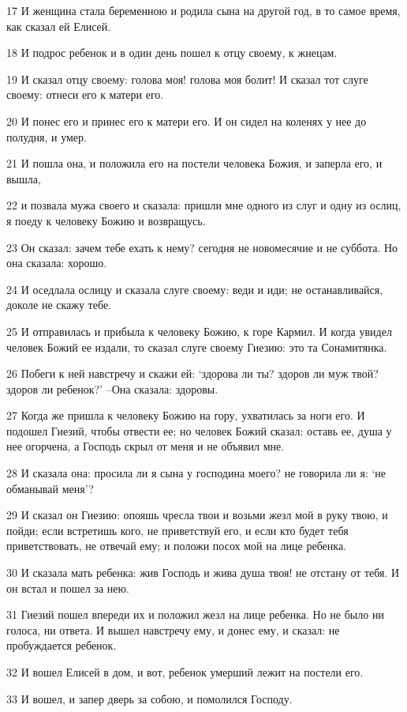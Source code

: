\par 17 И женщина стала беременною и родила сына на другой год, в то самое время, как сказал ей Елисей.
\par 18 И подрос ребенок и в один день пошел к отцу своему, к жнецам.
\par 19 И сказал отцу своему: голова моя! голова моя болит! И сказал тот слуге своему: отнеси его к матери его.
\par 20 И понес его и принес его к матери его. И он сидел на коленях у нее до полудня, и умер.
\par 21 И пошла она, и положила его на постели человека Божия, и заперла его, и вышла,
\par 22 и позвала мужа своего и сказала: пришли мне одного из слуг и одну из ослиц, я поеду к человеку Божию и возвращусь.
\par 23 Он сказал: зачем тебе ехать к нему? сегодня не новомесячие и не суббота. Но она сказала: хорошо.
\par 24 И оседлала ослицу и сказала слуге своему: веди и иди; не останавливайся, доколе не скажу тебе.
\par 25 И отправилась и прибыла к человеку Божию, к горе Кармил. И когда увидел человек Божий ее издали, то сказал слуге своему Гиезию: это та Сонамитянка.
\par 26 Побеги к ней навстречу и скажи ей: `здорова ли ты? здоров ли муж твой? здоров ли ребенок?' --Она сказала: здоровы.
\par 27 Когда же пришла к человеку Божию на гору, ухватилась за ноги его. И подошел Гиезий, чтобы отвести ее; но человек Божий сказал: оставь ее, душа у нее огорчена, а Господь скрыл от меня и не объявил мне.
\par 28 И сказала она: просила ли я сына у господина моего? не говорила ли я: `не обманывай меня'?
\par 29 И сказал он Гиезию: опояшь чресла твои и возьми жезл мой в руку твою, и пойди; если встретишь кого, не приветствуй его, и если кто будет тебя приветствовать, не отвечай ему; и положи посох мой на лице ребенка.
\par 30 И сказала мать ребенка: жив Господь и жива душа твоя! не отстану от тебя. И он встал и пошел за нею.
\par 31 Гиезий пошел впереди их и положил жезл на лице ребенка. Но не было ни голоса, ни ответа. И вышел навстречу ему, и донес ему, и сказал: не пробуждается ребенок.
\par 32 И вошел Елисей в дом, и вот, ребенок умерший лежит на постели его.
\par 33 И вошел, и запер дверь за собою, и помолился Господу.
